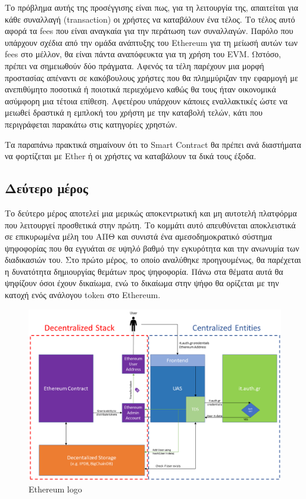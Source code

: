 Το πρόβλημα αυτής της προσέγγισης είναι πως, για τη λειτουργία της, απαιτείται για κάθε συναλλαγή (transaction) οι
χρήστες να καταβάλουν ένα τέλος. Το τέλος αυτό αφορά τα fees που είναι αναγκαία για την περάτωση των συναλλαγών. Παρόλο
που υπάρχουν σχέδια από την ομάδα ανάπτυξης του Ethereum για τη μείωσή αυτών των fees στο μέλλον, θα είναι πάντα
αναπόφευκτα για τη χρήση του EVM. Ωστόσο, πρέπει να σημειωθούν δύο πράγματα. Αφενός τα τέλη παρέχουν μια μορφή
προστασίας απέναντι σε κακόβουλους χρήστες που θα πλημμύριζαν την εφαρμογή με ανεπιθύμητο ποσοτικά ή ποιοτικά
περιεχόμενο καθώς θα τους ήταν οικονομικά ασύμφορη μια τέτοια επίθεση. Αφετέρου υπάρχουν κάποιες εναλλακτικές ώστε να
μειωθεί δραστικά η εμπλοκή του χρήστη με την καταβολή τελών, κάτι που περιγράφεται παρακάτω στις κατηγορίες χρηστών.

Τα παραπάνω πρακτικά σημαίνουν ότι το Smart Contract θα πρέπει ανά διαστήματα να φορτίζεται με Ether ή οι χρήστες να
καταβάλουν τα δικά τους έξοδα.

\subsection{Δεύτερο μέρος} \label{subsection:3-2-first-part}

Το δεύτερο μέρος αποτελεί μια μερικώς αποκεντρωτική και μη αυτοτελή πλατφόρμα που λειτουργεί προσθετικά στην πρώτη. Το
κομμάτι αυτό απευθύνεται αποκλειστικά σε επικυρωμένα μέλη του ΑΠΘ και συνιστά ένα αμεσοδημοκρατικό σύστημα ψηφοφορίας
που θα εγγυάται σε υψηλό βαθμό την εγκυρότητα και την ανωνυμία των διαδικασιών του. Στο πρώτο μέρος, το οποίο αναλύθηκε
προηγουμένως, θα παρέχεται η δυνατότητα δημιουργίας θεμάτων προς ψηφοφορία. Πάνω στα θέματα αυτά θα ψηφίζουν όσοι έχουν
δικαίωμα, ενώ το δικαίωμα στην ψήφο θα ορίζεται με την κατοχή ενός ανάλογου token στο Ethereum.

\begin{figure}[H]
    \centering
    \includegraphics[width=\textwidth]{assets/figures/chapter-3/uas}
    \caption{Ethereum logo}
\end{figure}

